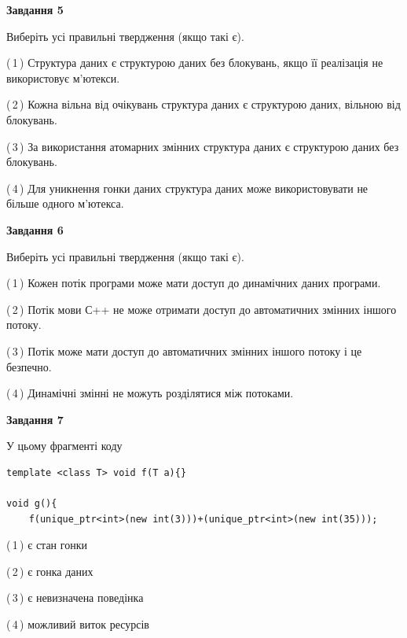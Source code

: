 \documentclass[12pt, ukrainian]{article}
\begin{document}
\begin {large}
{\begin{center}
\textbf{Завдання 5}
\end{center}

Виберіть усі правильні твердження (якщо такі є).\par
\vspace{2mm}

(\,1\,) Структура даних є структурою даних без блокувань, якщо її реалізація не використовує м’ютекси.%

(\,2\,) Кожна вільна від очікувань структура даних є структурою даних, вільною від блокувань.%

(\,3\,) За використання атомарних змінних структура даних є структурою даних без блокувань.%

(\,4\,) Для уникнення гонки даних структура даних може використовувати не більше одного м’ютекса.%
\newpage


\begin{center}
\textbf{Завдання 6}
\end{center}

Виберіть усі правильні твердження (якщо такі є).\par
\vspace{2mm}

(\,1\,) Кожен потік програми може мати доступ до динамічних даних програми.%

(\,2\,) Потік мови С++ не може отримати доступ до автоматичних змінних іншого потоку.%

(\,3\,) Потік може мати доступ до автоматичних змінних іншого потоку і це безпечно.%

(\,4\,) Динамічні змінні не можуть розділятися між потоками.%


\begin{center}
\textbf{Завдання 7}
\end{center}

У цьому фрагменті коду
\begin{verbatim}
template <class T> void f(T a){}

void g(){
    f(unique_ptr<int>(new int(3)))+(unique_ptr<int>(new int(35)));
\end{verbatim}

(\,1\,) є стан гонки%

(\,2\,) є гонка даних%

(\,3\,) є невизначена поведінка%

(\,4\,) можливий виток ресурсів%

}
\end {large}

\vspace{4mm}
\newpage
\end{document}
